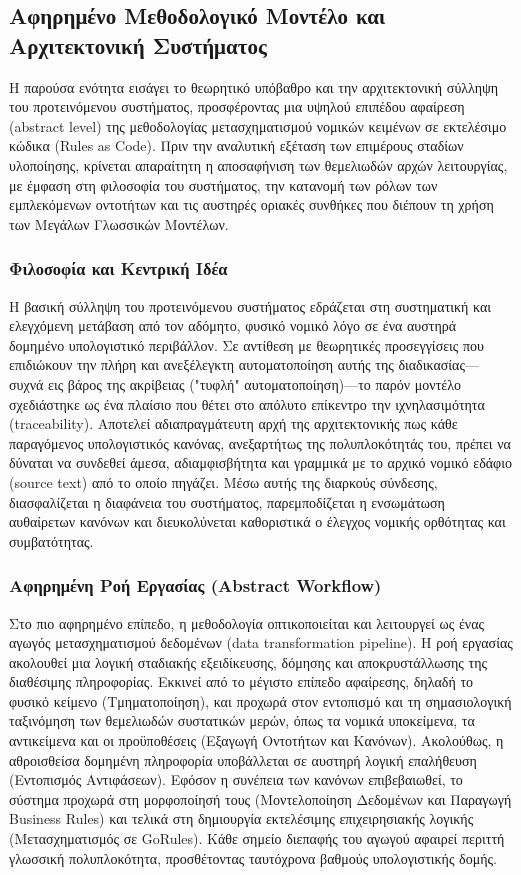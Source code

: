 \subsection{Αφηρημένο Μεθοδολογικό Μοντέλο και Αρχιτεκτονική Συστήματος}

Η παρούσα ενότητα εισάγει το θεωρητικό υπόβαθρο και την αρχιτεκτονική σύλληψη του προτεινόμενου συστήματος, προσφέροντας μια υψηλού επιπέδου αφαίρεση (abstract level) της μεθοδολογίας μετασχηματισμού νομικών κειμένων σε εκτελέσιμο κώδικα (Rules as Code). Πριν την αναλυτική εξέταση των επιμέρους σταδίων υλοποίησης, κρίνεται απαραίτητη η αποσαφήνιση των θεμελιωδών αρχών λειτουργίας, με έμφαση στη φιλοσοφία του συστήματος, την κατανομή των ρόλων των εμπλεκόμενων οντοτήτων και τις αυστηρές οριακές συνθήκες που διέπουν τη χρήση των Μεγάλων Γλωσσικών Μοντέλων.

\subsubsection{Φιλοσοφία και Κεντρική Ιδέα}
Η βασική σύλληψη του προτεινόμενου συστήματος εδράζεται στη συστηματική και ελεγχόμενη μετάβαση από τον αδόμητο, φυσικό νομικό λόγο σε ένα αυστηρά δομημένο υπολογιστικό περιβάλλον. Σε αντίθεση με θεωρητικές προσεγγίσεις που επιδιώκουν την πλήρη και ανεξέλεγκτη αυτοματοποίηση αυτής της διαδικασίας—συχνά εις βάρος της ακρίβειας ("τυφλή" αυτοματοποίηση)—το παρόν μοντέλο σχεδιάστηκε ως ένα πλαίσιο που θέτει στο απόλυτο επίκεντρο την ιχνηλασιμότητα (traceability). Αποτελεί αδιαπραγμάτευτη αρχή της αρχιτεκτονικής πως κάθε παραγόμενος υπολογιστικός κανόνας, ανεξαρτήτως της πολυπλοκότητάς του, πρέπει να δύναται να συνδεθεί άμεσα, αδιαμφισβήτητα και γραμμικά με το αρχικό νομικό εδάφιο (source text) από το οποίο πηγάζει. Μέσω αυτής της διαρκούς σύνδεσης, διασφαλίζεται η διαφάνεια του συστήματος, παρεμποδίζεται η ενσωμάτωση αυθαίρετων κανόνων και διευκολύνεται καθοριστικά ο έλεγχος νομικής ορθότητας και συμβατότητας.

\subsubsection{Αφηρημένη Ροή Εργασίας (Abstract Workflow)}
Στο πιο αφηρημένο επίπεδο, η μεθοδολογία οπτικοποιείται και λειτουργεί ως ένας αγωγός μετασχηματισμού δεδομένων (data transformation pipeline). Η ροή εργασίας ακολουθεί μια λογική σταδιακής εξειδίκευσης, δόμησης και αποκρυστάλλωσης της διαθέσιμης πληροφορίας. Εκκινεί από το μέγιστο επίπεδο αφαίρεσης, δηλαδή το φυσικό κείμενο (Τμηματοποίηση), και προχωρά στον εντοπισμό και τη σημασιολογική ταξινόμηση των θεμελιωδών συστατικών μερών, όπως τα νομικά υποκείμενα, τα αντικείμενα και οι προϋποθέσεις (Εξαγωγή Οντοτήτων και Κανόνων). Ακολούθως, η αθροισθείσα δομημένη πληροφορία υποβάλλεται σε αυστηρή λογική επαλήθευση (Εντοπισμός Αντιφάσεων). Εφόσον η συνέπεια των κανόνων επιβεβαιωθεί, το σύστημα προχωρά στη μορφοποίησή τους (Μοντελοποίηση Δεδομένων και Παραγωγή Business Rules) και τελικά στη δημιουργία εκτελέσιμης επιχειρησιακής λογικής (Μετασχηματισμός σε GoRules). Κάθε σημείο διεπαφής του αγωγού αφαιρεί περιττή γλωσσική πολυπλοκότητα, προσθέτοντας ταυτόχρονα βαθμούς υπολογιστικής δομής.

